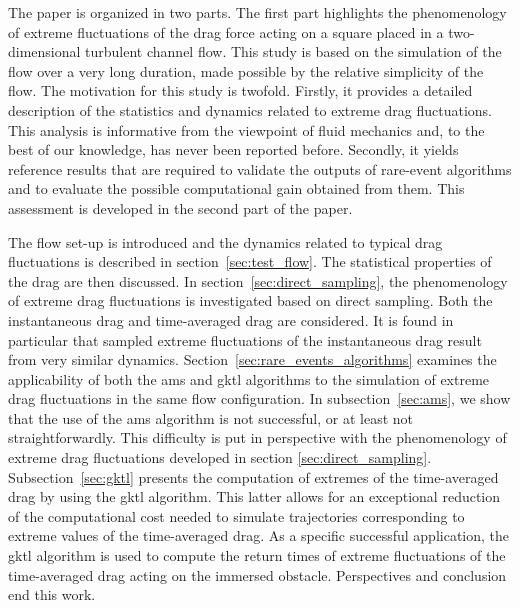 %
The paper is organized in two parts. The first part highlights the phenomenology of extreme fluctuations of the drag force acting on a square placed in a two-dimensional turbulent channel flow. This study is based on the simulation of the flow over a very long duration, made possible by the relative simplicity of the flow.
%
The motivation for this study is twofold.
Firstly, it provides a detailed description of the statistics and dynamics related to extreme drag fluctuations. This analysis is informative from the  viewpoint of fluid mechanics and, to the best of our knowledge, has never been reported before.
Secondly, it yields reference results that are required to validate the outputs of rare-event algorithms and to evaluate the possible computational gain obtained from them. This assessment is developed in the second part of the paper.

The flow set-up is introduced and the dynamics related to typical
drag fluctuations is described in section~\ref{sec:test_flow}.
The statistical properties of the drag are then discussed.
In section~\ref{sec:direct_sampling}, the phenomenology of  extreme drag fluctuations is investigated based on direct sampling.
Both the instantaneous drag and time-averaged drag are considered.
It is found in particular that sampled extreme fluctuations of the instantaneous drag result from very similar dynamics. 
Section~\ref{sec:rare_events_algorithms} examines the applicability of both the \ac{ams} and \ac{gktl} algorithms to the simulation of extreme drag fluctuations in the same flow configuration.
In subsection~\ref{sec:ams}, we show that the use of the \ac{ams} algorithm is not successful, or at least not straightforwardly. This difficulty is put in perspective with the phenomenology of extreme drag fluctuations developed in  section \ref{sec:direct_sampling}.
Subsection~\ref{sec:gktl} presents the computation of extremes of the time-averaged drag by using the \ac{gktl} algorithm.
This latter allows for an exceptional reduction of the computational cost needed to simulate trajectories corresponding to extreme values of the time-averaged drag.
As a specific successful application, the \ac{gktl} algorithm is used to compute the return times of extreme fluctuations of the time-averaged drag acting on the immersed obstacle.
Perspectives and conclusion end this work.
